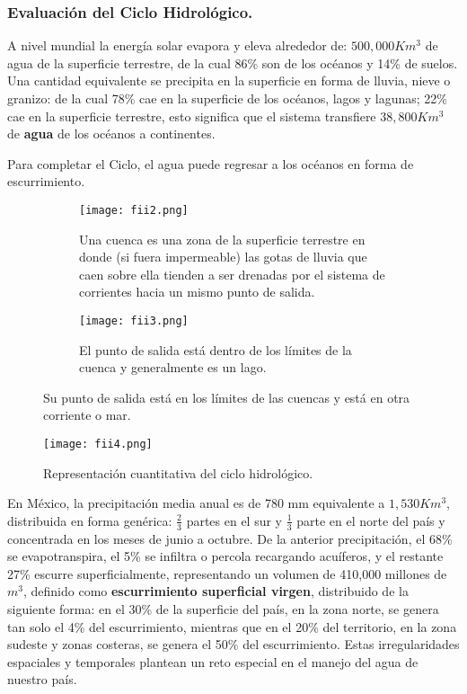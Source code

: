 \subsubsection{Evaluación del Ciclo Hidrológico.} \label{subsubciclohidro}
A nivel mundial la energía solar evapora y eleva alrededor de: $500,000 Km^3$ de agua de la superficie terrestre, de la cual 86\% son de los océanos y 14\% de suelos. Una cantidad equivalente se precipita en la superficie en forma de lluvia, nieve o granizo: de la cual 78\% cae en la superficie de los océanos, lagos y lagunas; 22\% cae en la superficie terrestre, esto significa que el sistema transfiere $38,800 Km^3$ de \textbf{agua} de los océanos a continentes.

Para completar el Ciclo, el agua puede regresar a los océanos en forma
de escurrimiento.
\begin{figure}[h!]
	\centering
	\begin{subfigure}[b]{0.4\linewidth}
		\texttt{[image: fii2.png]}
		\caption{Una cuenca es una zona de la superficie terrestre en donde (si fuera impermeable) las gotas de lluvia que caen sobre ella tienden a ser drenadas por el sistema de corrientes hacia un mismo punto de salida.}
		\label{fii2}
	\end{subfigure}
	\begin{subfigure}[b]{0.4\linewidth}
		\texttt{[image: fii3.png]}
		\caption{El punto de salida está dentro de los límites de la cuenca y generalmente es un lago.}
		\label{fii3}
	\end{subfigure}
	\caption{Su punto de salida está en los límites de las cuencas y está en
		otra corriente o mar.}
	\label{fig2-3}
\end{figure}
\begin{figure}[h!]
	\centerline{\texttt{[image: fii4.png]}}
	\caption{Representación cuantitativa del ciclo hidrológico.}
	\label{fii4}
\end{figure}
En México, la precipitación media anual es de 780 mm equivalente a $1,530 Km^3$, distribuida en forma genérica: $\frac{2}{3}$ partes en el sur y $\frac{1}{3}$ parte en el norte del país y concentrada en los meses de junio a octubre. De la anterior precipitación, el 68\% se evapotranspira, el 5\% se infiltra o percola recargando acuíferos, y el restante 27\% escurre superficialmente, representando un volumen de 410,000 millones de $m^3$, definido como \textbf{escurrimiento superficial virgen}, distribuido de la siguiente forma: en el 30\% de la superficie del país, en la zona norte, se genera tan solo el 4\% del escurrimiento, mientras que en el 20\% del territorio, en la zona sudeste y zonas costeras, se genera el 50\% del escurrimiento. Estas irregularidades espaciales y temporales plantean un reto especial en el manejo del agua de nuestro país.

